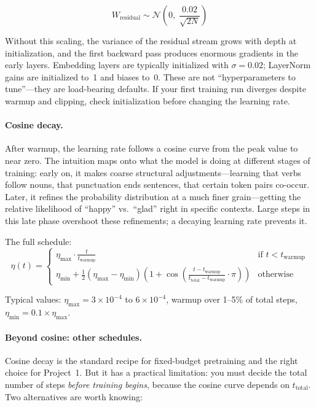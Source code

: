 \[
  W_{\text{residual}} \sim \mathcal{N}\!\left(0,\; \frac{0.02}{\sqrt{2N}}\right)
\]

\noindent Without this scaling, the variance of the residual stream grows with depth at initialization, and the first backward pass produces enormous gradients in the early layers. Embedding layers are typically initialized with $\sigma = 0.02$; LayerNorm gains are initialized to~1 and biases to~0. These are not ``hyperparameters to tune''---they are load-bearing defaults. If your first training run diverges despite warmup and clipping, check initialization before changing the learning rate.

\paragraph{Cosine decay.} After warmup, the learning rate follows a cosine curve from the peak value to near zero. The intuition maps onto what the model is doing at different stages of training: early on, it makes coarse structural adjustments---learning that verbs follow nouns, that punctuation ends sentences, that certain token pairs co-occur. Later, it refines the probability distribution at a much finer grain---getting the relative likelihood of ``happy'' vs.\ ``glad'' right in specific contexts. Large steps in this late phase overshoot these refinements; a decaying learning rate prevents it.

The full schedule:
\[
  \eta(t) = \begin{cases}
    \eta_{\max} \cdot \frac{t}{t_{\text{warmup}}} & \text{if } t < t_{\text{warmup}} \\[6pt]
    \eta_{\min} + \frac{1}{2}(\eta_{\max} - \eta_{\min})\left(1 + \cos\left(\frac{t - t_{\text{warmup}}}{t_{\text{total}} - t_{\text{warmup}}} \cdot \pi\right)\right) & \text{otherwise}
  \end{cases}
\]

Typical values: $\eta_{\max} = 3 \times 10^{-4}$ to $6 \times 10^{-4}$, warmup over 1--5\% of total steps, $\eta_{\min} = 0.1 \times \eta_{\max}$.

\paragraph{Beyond cosine: other schedules.} Cosine decay is the standard recipe for fixed-budget pretraining and the right choice for Project~1. But it has a practical limitation: you must decide the total number of steps \emph{before training begins}, because the cosine curve depends on $t_{\text{total}}$. Two alternatives are worth knowing:

